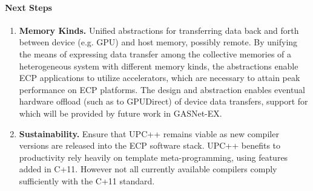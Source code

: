 \paragraph{Next Steps}

\begin{enumerate}
\item \textbf{Memory Kinds.}
Unified abstractions for 
transferring data back and forth between device (e.g. GPU) and host memory, possibly remote.
By unifying the means of expressing data transfer among the collective memories of a heterogeneous system with different memory kinds,
the abstractions enable ECP applications to utilize accelerators, which are necessary to attain peak performance on ECP platforms.
The design and abstraction enables eventual hardware offload (such as to GPUDirect) of device data transfers, support for which will be provided by future work in GASNet-EX.

\item \textbf{Sustainability.}
Ensure that UPC++ remains viable as new compiler versions are released into the ECP software stack. UPC++ benefits to productivity rely heavily on template meta-programming, using features added in C+11.  However not all currently available compilers comply sufficiently with the C+11 standard.

\end{enumerate}
